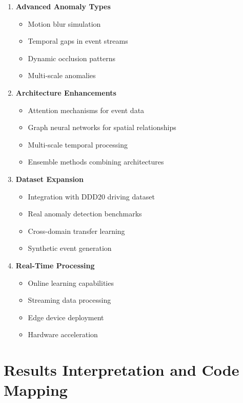 \documentclass[12pt,a4paper]{article}
\begin{document}
\begin{enumerate}
    \item \textbf{Advanced Anomaly Types}
    \begin{itemize}
        \item Motion blur simulation
        \item Temporal gaps in event streams
        \item Dynamic occlusion patterns
        \item Multi-scale anomalies
    \end{itemize}

    \item \textbf{Architecture Enhancements}
    \begin{itemize}
        \item Attention mechanisms for event data
        \item Graph neural networks for spatial relationships
        \item Multi-scale temporal processing
        \item Ensemble methods combining architectures
    \end{itemize}

    \item \textbf{Dataset Expansion}
    \begin{itemize}
        \item Integration with DDD20 driving dataset
        \item Real anomaly detection benchmarks
        \item Cross-domain transfer learning
        \item Synthetic event generation
    \end{itemize}

    \item \textbf{Real-Time Processing}
    \begin{itemize}
        \item Online learning capabilities
        \item Streaming data processing
        \item Edge device deployment
        \item Hardware acceleration
    \end{itemize}
\end{enumerate}

\section{Results Interpretation and Code Mapping}
\end{document}
